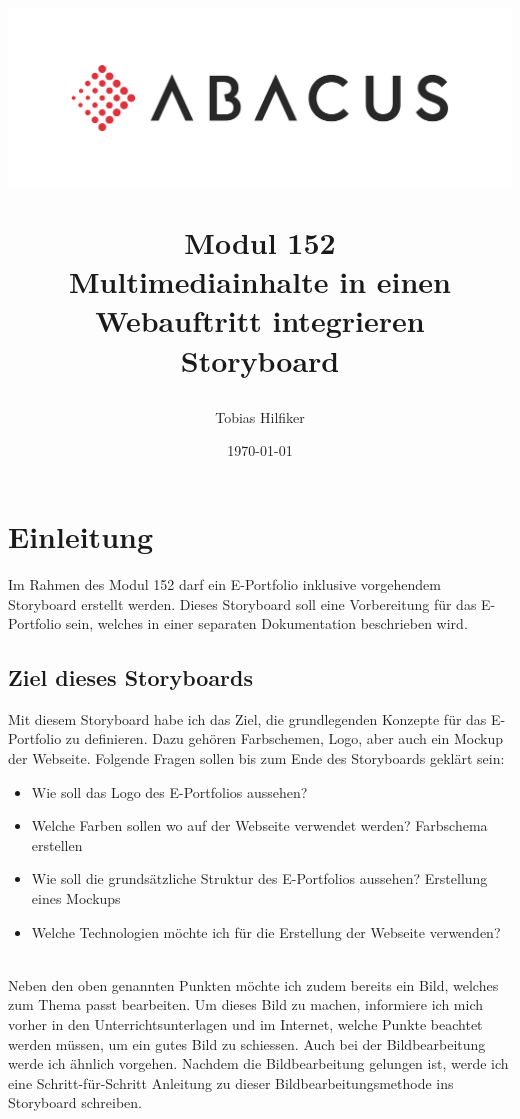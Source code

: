 \documentclass[11pt]{article}
\title{
    \includegraphics{media/frontpage.jpg}
    \begin{center}
        Modul 152 \\
        Multimediainhalte in einen Webauftritt integrieren\\
        Storyboard
    \end{center}}
\author{Tobias Hilfiker}
\date{\today}
\begin{document}
    \begin{titlingpage}
        \maketitle
    \end{titlingpage}
    \pagebreak

    \tableofcontents
    \pagebreak



    \section{Einleitung}
    Im Rahmen des Modul 152 darf ein E-Portfolio inklusive vorgehendem Storyboard erstellt werden.
    Dieses Storyboard soll eine Vorbereitung für das E-Portfolio sein, welches in einer separaten
    Dokumentation beschrieben wird.


    \subsection{Ziel dieses Storyboards}
    Mit diesem Storyboard habe ich das Ziel, die grundlegenden Konzepte für das E-Portfolio zu definieren.
    Dazu gehören Farbschemen, Logo, aber auch ein Mockup der Webseite.
    Folgende Fragen sollen bis zum Ende des Storyboards geklärt sein:
    \begin{itemize}
        \item Wie soll das Logo des E-Portfolios aussehen?
        \item Welche Farben sollen wo auf der Webseite verwendet werden? \textrightarrow Farbschema erstellen
        \item Wie soll die grundsätzliche Struktur des E-Portfolios aussehen?
        \textrightarrow Erstellung eines Mockups
        \item Welche Technologien möchte ich für die Erstellung der Webseite verwenden?
    \end{itemize}
    \\
    Neben den oben genannten Punkten möchte ich zudem bereits ein Bild, welches zum Thema passt bearbeiten.
    Um dieses Bild zu machen, informiere ich mich vorher in den Unterrichtsunterlagen und im Internet, welche
    Punkte beachtet werden müssen, um ein gutes Bild zu schiessen.
    Auch bei der Bildbearbeitung werde ich ähnlich vorgehen. Nachdem die Bildbearbeitung gelungen ist, werde
    ich eine Schritt-für-Schritt Anleitung zu dieser Bildbearbeitungsmethode ins Storyboard schreiben.
\end{document}
